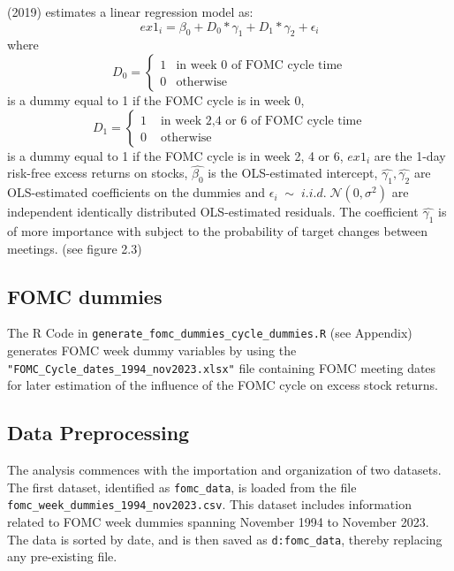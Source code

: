 \cite{cieslak_stock_2019} (2019) estimates a linear regression model as:
\begin{equation}
	ex1_{i}=\beta_{0}+D_0*\gamma_{1}+D_1*\gamma_{2}+\epsilon_i
\end{equation}
where
\begin{equation}
    D_0=
    \begin{cases}
      1& \text{in week 0 of FOMC cycle time}\\
      0& \text{otherwise}
    \end{cases}
\end{equation}
is a dummy equal to 1 if the FOMC cycle is in week 0,
\begin{equation}
    D_1=
    \begin{cases}
      1 & \text{ in week 2,4 or 6 of FOMC cycle time} \\
      0 & \text{ otherwise}
    \end{cases}
\end{equation}
is a dummy equal to 1 if the FOMC cycle is in week 2,  4 or 6,
$ {ex1_{i}} $ are the 1-day risk-free excess returns on stocks,
$ { \hat{\beta_{0}} } $ is the OLS-estimated intercept,
$ { \hat{\gamma_{1}}, \hat{\gamma_{2}} } $  are OLS-estimated coefficients on the dummies and
$ { \epsilon_i \; \sim \; i.i.d.  \; \mathcal{N}\left(0, \sigma^2 \right) } $
are independent identically distributed OLS-estimated residuals. 
The coefficient $ {\hat{\gamma_{1}}} $ is of more importance with subject to the probability of target changes between meetings. (see figure 2.3)

\subsection{FOMC dummies}

The R Code in \texttt{generate\_fomc\_dummies\_cycle\_dummies.R} (see Appendix)
generates FOMC week dummy variables by using the \texttt{"FOMC\_Cycle\_dates\_1994\_nov2023.xlsx"} file containing FOMC meeting dates for later estimation of the influence of the FOMC cycle on excess stock returns.

\subsection{Data Preprocessing}

The analysis commences with the importation and organization of two datasets. 
The first dataset, identified as \texttt{fomc\_data}, is loaded from the file \texttt{fomc\_week\_dummies\_1994\_nov2023.csv}. 
This dataset includes information related to FOMC week dummies spanning November 1994 to November 2023. The data is sorted by date, and is then saved as \texttt{d:fomc\_data}, thereby replacing any pre-existing file.

